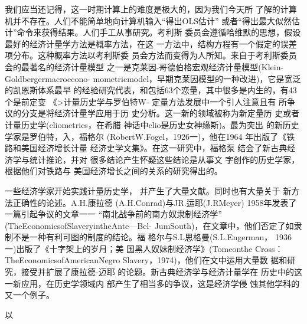 我们应当还记得，这一时期计算上的难度是极大的，因为我们今天所
了解的计算机并不存在。人们不能简单地向计算机输入“得出OLS估计”
或者“得出最大似然估计”命令来获得结果。人们手工从事研究。考利斯
委员会遵循哈维默的思想，假设最好的经济计量学方法是概率方法，在这
一方法中，结构方程有一个假定的误差项分布。这种概率方法以考利斯委
员会方法而变得为人所知。来自于考利斯委员会的最著名的经济计量模型
之一是克莱因-哥德伯格宏观经济计量模型(Klein-Goldbergermacroecono-
mometricmodel，早期克莱因模型的一种改进)，它是宽泛的凯恩斯体系最早
的经验研究代表，和包括63个恋量，其中很多是内生的，有43个是前定变
《>计量历史学与罗伯特W-
定量方法发展中一个引人注意且有
所争议的分支是将经济计量学应用于历
史分析。这一新的领域被称为新定量历
史或者计量历史学(cliometrics，在希腊
神话中clio是历史女神缘斯)。最为突出
的新历史学家是罗伯特，入，福格尔
(RobertW.Fogel，1926一)，他在1964
年出版了《铁路和美国经济增长计量
经济史学文集》。在这一研究中，福格泵
结会了新古典经济学与统计推论，并对
很多结论产生怀疑这些结论是从事文
字创作的历史学家，根据他们对铁路与
美国经济增长之间的关系的研究得出的。

一些经济学家开始实践计量历史学，
并产生了大量文献。同时也有大量关于
新方法正确性的论述。A.H.康拉德
(A.H.Conrad)与JR.运耶(J.RMeyer)
1958年发表了一篇引起争议的文章一一
“南北战争前的南方奴隶制经济学”
(TheEconomicsofSlaveryintheAnte—Bel-
JumSouth)，在文章中，他们否定了如隶
制不是一种有利可图的制度的结论。福
格尔与S.L思格曼(S.L.Engerman，
1936一)出版了《十字架上的岁月；美
国黑人奴妹制经济学》(Tomeonthe
Cross：TheEconomicsofAmericanNegro
Slavery，1974)，他们在文中运用大量数
据和研究，接受并扩展了康拉德-迈耶
的论题。新古典经济学与经济计量学在
历史中的这一新应用，在历史学领域内
部产生了相当多的争议，这是经济学侵
蚀其他学科的又一个例子。

以

